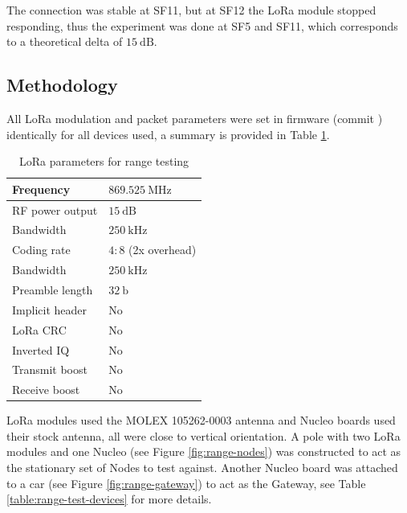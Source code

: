 The connection was stable at SF11, but at SF12 the LoRa module stopped responding, thus the experiment was done at SF5 and SF11, which corresponds to a theoretical delta of $15~\mathrm{dB}$.

\subsection{Methodology}
All LoRa modulation and packet parameters were set in firmware (commit ) identically for all devices used, a summary is provided in Table \ref{table:range-test-parameters}. 

\begin{table}[H]
\begin{center}
\caption{\label{table:range-test-parameters}LoRa parameters for range testing}
    \begin{tabular}{|l|l|} \hline
    Frequency             & $869.525~\mathrm{MHz}$\\ \hline
    RF power output       & $15~\mathrm{dB}$\\ \hline
    Bandwidth             & $250~\mathrm{kHz}$\\ \hline
    Coding rate           & $4:8$ (2x overhead) \\ \hline
    Bandwidth             & $250~\mathrm{kHz}$\\ \hline
    Preamble length       & $32~\mathrm{b}$\\ \hline
    Implicit header       & No\\ \hline
    LoRa CRC              & No\\ \hline
    Inverted IQ           & No\\ \hline
    Transmit boost        & No\\ \hline
    Receive boost         & No\\ \hline
    \end{tabular}
\end{center}
\end{table}

LoRa modules used the MOLEX 105262-0003 antenna and Nucleo boards used their stock antenna, all were close to vertical orientation. A pole with two LoRa modules and one Nucleo (see Figure \ref{fig:range-nodes}) was constructed to act as the stationary set of Nodes to test against. Another Nucleo board was attached to a car (see Figure \ref{fig:range-gateway}) to act as the Gateway, see Table \ref{table:range-test-devices} for more details.

